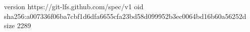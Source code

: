 version https://git-lfs.github.com/spec/v1
oid sha256:a007336f06ba7cbf1d6dfa6655cfa23bd58d099952b3ec0064bd16b60a56252d
size 2289
